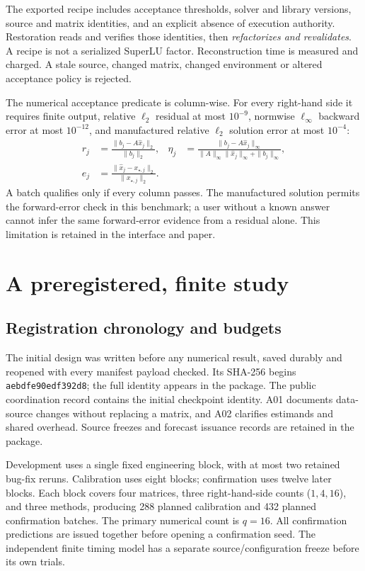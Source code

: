 \documentclass[11pt,a4paper]{article}
\begin{document}
The exported recipe includes acceptance thresholds, solver and library versions, source and matrix identities, and an explicit absence of execution authority. Restoration reads and verifies those identities, then \emph{refactorizes and revalidates}. A recipe is not a serialized SuperLU factor. Reconstruction time is measured and charged. A stale source, changed matrix, changed environment or altered acceptance policy is rejected.

The numerical acceptance predicate is column-wise. For every right-hand side it requires finite output, relative $\ell_2$ residual at most $10^{-9}$, normwise $\ell_\infty$ backward error at most $10^{-12}$, and manufactured relative $\ell_2$ solution error at most $10^{-4}$:
\begin{align}
r_j&=\frac{\|b_j-A\hat x_j\|_2}{\|b_j\|_2}, &
\eta_j&=\frac{\|b_j-A\hat x_j\|_\infty}{\|A\|_\infty\|\hat x_j\|_\infty+\|b_j\|_\infty},\\
e_j&=\frac{\|\hat x_j-x_{\star,j}\|_2}{\|x_{\star,j}\|_2}.&&
\end{align}
A batch qualifies only if every column passes. The manufactured solution permits the forward-error check in this benchmark; a user without a known answer cannot infer the same forward-error evidence from a residual alone. This limitation is retained in the interface and paper.

\section{A preregistered, finite study}
\subsection{Registration chronology and budgets}
The initial design was written before any numerical result, saved durably and reopened with every manifest payload checked. Its SHA-256 begins \texttt{aebdfe90edf392d8}; the full identity appears in the package. The public coordination record contains the initial checkpoint identity. \citep{registration2026} A01 documents data-source changes without replacing a matrix, and A02 clarifies estimands and shared overhead. Source freezes and forecast issuance records are retained in the package.

Development uses a single fixed engineering block, with at most two retained bug-fix reruns. Calibration uses eight blocks; confirmation uses twelve later blocks. Each block covers four matrices, three right-hand-side counts ($1,4,16$), and three methods, producing 288 planned calibration and 432 planned confirmation batches. The primary numerical count is $q=16$. All confirmation predictions are issued together before opening a confirmation seed. The independent finite timing model has a separate source/configuration freeze before its own trials.
\end{document}
